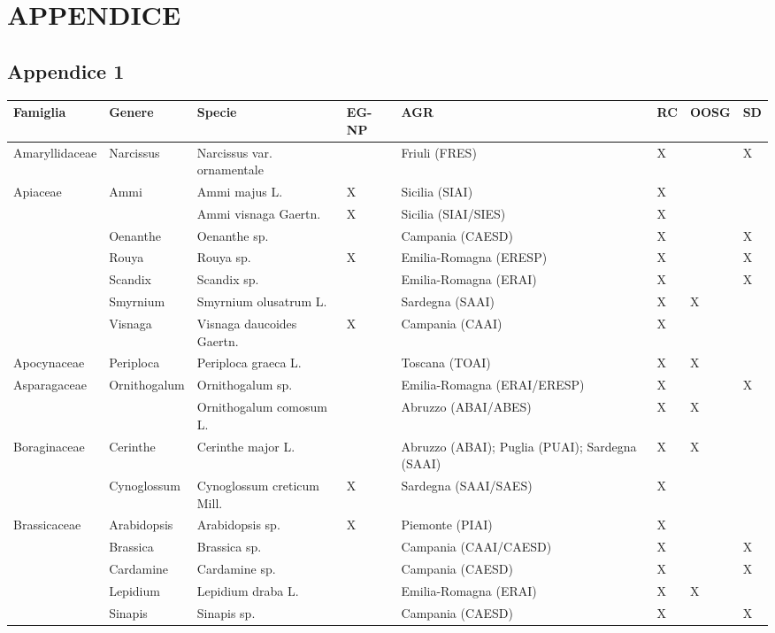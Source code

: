 \documentclass[main.tex]{subfiles}
\begin{document}
\section{APPENDICE}
\subsection{Appendice 1}

\begin{table}[!ht]
    \centering
    \begin{tabular}[\footnotesize]{|p{2.2cm}|p{2.2cm}|p{2.2cm}|p{1.1cm}|p{1.6cm}|p{0.8cm}|p{1cm}|p{0.8cm}|}
    \hline
        \textbf{Famiglia} & \textbf{Genere} & \textbf{Specie} & \textbf{EG-NP} & \textbf{AGR} & \textbf{RC} & \textbf{OOSG} & \textbf{SD} \\ \hline
        Amaryllidaceae & Narcissus & Narcissus var. ornamentale & ~ & Friuli (FRES) & X & ~ & X \\ \hline
        Apiaceae & Ammi & Ammi majus L. & X & Sicilia (SIAI) & X & ~ & ~ \\ \hline
        ~ & ~ & Ammi visnaga Gaertn. & X & Sicilia (SIAI/SIES) & X & ~ & ~ \\ \hline
        ~ & Oenanthe & Oenanthe sp. & ~ & Campania (CAESD) & X & ~ & X \\ \hline
        ~ & Rouya & Rouya sp. & X & Emilia-Romagna (ERESP) & X & ~ & X \\ \hline
        ~ & Scandix & Scandix sp.  & ~ & Emilia-Romagna (ERAI) & X & ~ & X \\ \hline
        ~ & Smyrnium & Smyrnium olusatrum L. & ~ & Sardegna (SAAI) & X & X & ~ \\ \hline
        ~ & Visnaga & Visnaga daucoides Gaertn. & X & Campania (CAAI) & X & ~ & ~ \\ \hline
        Apocynaceae & Periploca & Periploca graeca L. & ~ & Toscana (TOAI) & X & X & ~ \\ \hline
        Asparagaceae & Ornithogalum  & Ornithogalum sp. & ~ & Emilia-Romagna (ERAI/ERESP) & X & ~ & X \\ \hline
        ~ & ~ & Ornithogalum comosum L. & ~ & Abruzzo (ABAI/ABES) & X & X & ~ \\ \hline
        Boraginaceae & Cerinthe & Cerinthe major L. & ~ & Abruzzo (ABAI); Puglia (PUAI); Sardegna (SAAI) & X & X & ~ \\ \hline
        ~ & Cynoglossum & Cynoglossum creticum Mill. & X & Sardegna (SAAI/SAES) & X & ~ & ~ \\ \hline
            Brassicaceae & Arabidopsis & Arabidopsis sp. & X & Piemonte (PIAI) & X & ~ & ~ \\ \hline
        ~ & Brassica  & Brassica sp. & ~ & Campania (CAAI/CAESD) & X & ~ & X \\ \hline
        ~ & Cardamine  & Cardamine sp. & ~ & Campania (CAESD) & X & ~ & X \\ \hline
        ~ & Lepidium & Lepidium draba L. & ~ & Emilia-Romagna (ERAI) & X & X & ~ \\ \hline
        ~ & Sinapis  & Sinapis sp. & ~ & Campania (CAESD) & X & ~ & X \\ \hline
    \end{tabular}
    \end{table}
    
\end{document}
